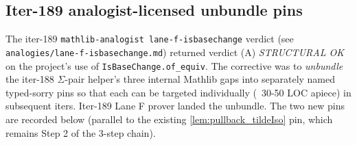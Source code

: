 \subsection{Iter-189 analogist-licensed unbundle pins}
\label{sec:quot_iter189_unbundle}

The iter-189 \texttt{mathlib-analogist lane-f-isbasechange} verdict
(see \texttt{analogies/lane-f-isbasechange.md}) returned verdict (A)
\emph{STRUCTURAL OK} on the project's use of
\texttt{IsBaseChange.of\_equiv}. The corrective was to \emph{unbundle}
the iter-188 \(\Sigma\)-pair helper's three internal Mathlib gaps into
separately named typed-sorry pins so that each can be targeted
individually (~30-50 LOC apiece) in subsequent iters. Iter-189 Lane F
prover landed the unbundle. The two new pins are recorded below
(parallel to the existing \cref{lem:pullback_tildeIso} pin, which
remains Step 2 of the 3-step chain).

